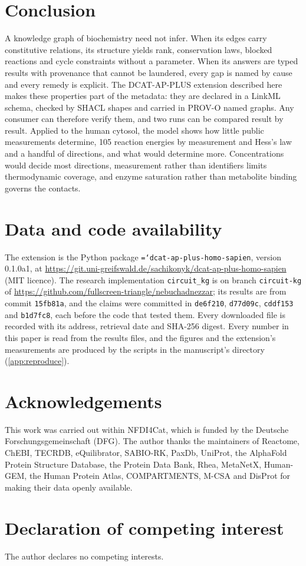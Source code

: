 \documentclass[5p]{elsarticle}
\theoremstyle{definition}
\theoremstyle{plain}
\newcommand{\breakingtt}[1]{\texttt{\hyphenchar\font=`\-\relax #1}}  %
\begin{document}
\section{Conclusion}
\label{sec:conclusion}

A knowledge graph of biochemistry need not infer.
When its edges carry constitutive relations, its structure yields rank, conservation laws, blocked reactions and cycle constraints without a parameter.
When its answers are typed results with provenance that cannot be laundered, every gap is named by cause and every remedy is explicit.
The DCAT-AP-PLUS extension described here makes these properties part of the metadata: they are declared in a LinkML schema, checked by SHACL shapes and carried in PROV-O named graphs.
Any consumer can therefore verify them, and two runs can be compared result by result.
Applied to the human cytosol, the model shows how little public measurements determine, 105 reaction energies by measurement and Hess's law and a handful of directions, and what would determine more.
Concentrations would decide most directions, measurement rather than identifiers limits thermodynamic coverage, and enzyme saturation rather than metabolite binding governs the contacts.

\section*{Data and code availability}
The extension is the Python package \breakingtt{dcat-ap-plus-homo-sapien}, version 0.1.0a1, at \url{https://git.uni-greifswald.de/sachikonyk/dcat-ap-plus-homo-sapien} (MIT licence).
The research implementation \texttt{circuit\_kg} is on branch \texttt{circuit-kg} of \url{https://github.com/fullscreen-triangle/nebuchadnezzar}; its results are from commit \texttt{15fb81a}, and the claims were committed in \texttt{de6f210}, \texttt{d77d09c}, \texttt{cddf153} and \texttt{b1d7fc8}, each before the code that tested them.
Every downloaded file is recorded with its address, retrieval date and SHA-256 digest.
Every number in this paper is read from the results files, and the figures and the extension's measurements are produced by the scripts in the manuscript's directory (\ref{app:reproduce}).

\section*{Acknowledgements}
This work was carried out within NFDI4Cat, which is funded by the Deutsche Forschungsgemeinschaft (DFG).
The author thanks the maintainers of Reactome, ChEBI, TECRDB, eQuilibrator, SABIO-RK, PaxDb, UniProt, the AlphaFold Protein Structure Database, the Protein Data Bank, Rhea, MetaNetX, Human-GEM, the Human Protein Atlas, COMPARTMENTS, M-CSA and DisProt for making their data openly available.

\section*{Declaration of competing interest}
The author declares no competing interests.




\appendix

\end{document}
